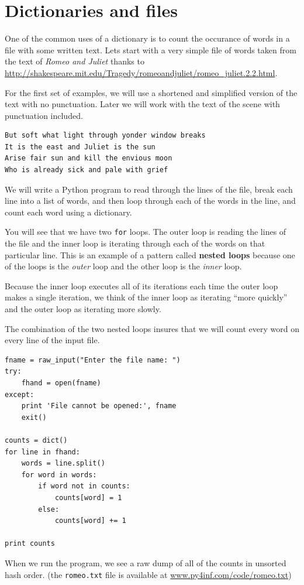 \documentclass[10pt]{book}
\begin{document}
\section{Dictionaries and files}

One of the common uses of a dictionary is to count the occurance
of words in a file with some written text.  
Lets start with a very simple file of
words taken from the text of {\em Romeo and Juliet}
thanks to 
\url{http://shakespeare.mit.edu/Tragedy/romeoandjuliet/romeo_juliet.2.2.html}.

For the first set of examples, we will use a shortened and simplified version
of the text with no punctuation.  Later we will work with the text of the 
scene with punctuation included.

\beforeverb
\begin{verbatim}
But soft what light through yonder window breaks
It is the east and Juliet is the sun
Arise fair sun and kill the envious moon
Who is already sick and pale with grief
\end{verbatim}
\afterverb
%
We will write a Python program to read through the lines of the file, 
break each line into a list of words, and then loop through each 
of the words in the line, and count each word using a dictionary.

You will see that we have two {\tt for} loops.  The outer loop is reading the
lines of the file and the inner loop is iterating through each
of the words on that particular line.  This is an example
of a pattern called {\bf nested loops} because one of the loops
is the {\em outer} loop and the other loop is the {\em inner}
loop.  

Because the inner loop executes all of its iterations each time
the outer loop makes a single iteration, we think of the inner
loop as iterating ``more quickly'' and the outer loop as iterating 
more slowly.

The combination of the two nested loops insures that we will count
every word on every line of the input file.

\beforeverb
\begin{verbatim}
fname = raw_input("Enter the file name: ")
try:
    fhand = open(fname)
except:
    print 'File cannot be opened:', fname
    exit()

counts = dict()
for line in fhand:
    words = line.split()
    for word in words:
        if word not in counts:
            counts[word] = 1
        else:
            counts[word] += 1

print counts
\end{verbatim}
\afterverb
%
When we run the program, we see a raw dump of all of the counts in unsorted
hash order.
(the {\tt romeo.txt} file is available at
\url{www.py4inf.com/code/romeo.txt})
\end{document}
